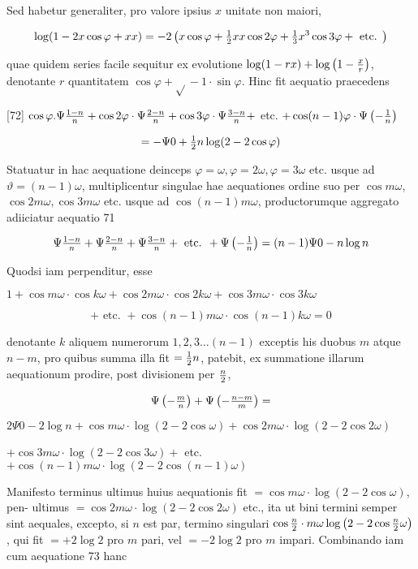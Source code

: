 \documentclass[twoside,12pt, showframe]{memoir}
\let\oldfrac\frac
\def\frac#1#2{\mathchoice{\tfrac{#1}{#2}}{\oldfrac{#1}{#2}}{\genfrac{}{}{}{2}{#1}{#2\mathstrut}}{\genfrac{}{}{}{3}{#1}{#2\mathstrut}}}
\begin{document}
Sed habetur generaliter, pro valore ipsius \(x\) unitate non maiori,

\[
\log (1-2 x \cos \varphi+x x)=-2\left(x \cos \varphi+\frac{1}{2} x x \cos 2 \varphi+\frac{1}{3} x^{3} \cos 3 \varphi+\text { etc. }\right)
\]

quae quidem series facile sequitur ex evolutione \(\log (1-r x)+\log \left(1-\frac{x}{r}\right)\), denotante \(r\) quantitatem \(\cos \varphi+\sqrt{ }-1 \cdot \sin \varphi\). Hinc fit aequatio praecedens

[72] \(\cos \varphi . \Psi \frac{1-n}{n}+\cos 2 \varphi \cdot \Psi \frac{2-n}{n}+\cos 3 \varphi \cdot \Psi \frac{3-n}{n}+\) etc. \(+\cos (n-1) \varphi \cdot \Psi\left(-\frac{1}{n}\right)\)

\[
=-\Psi 0+\frac{1}{2} n \log (2-2 \cos \varphi)
\]

Statuatur in hac aequatione deinceps \(\varphi=\omega, \varphi=2 \omega, \varphi=3 \omega\) etc. usque ad \(\vartheta=(n-1) \omega\), multiplicentur singulae hae aequationes ordine suo per \(\cos m \omega\), \(\cos 2 m \omega, \cos 3 m \omega\) etc. usque ad \(\cos (n-1) m \omega\), productorumque aggregato adiiciatur aequatio 71

\[
\Psi \frac{1-n}{n}+\Psi \frac{2-n}{n}+\Psi \frac{3-n}{n}+\text { etc. }+\Psi\left(-\frac{1}{n}\right)=(n-1) \Psi 0-n \log n
\]

Quodsi iam perpenditur, esse

\(1+\cos m \omega \cdot \cos k \omega+\cos 2 m \omega \cdot \cos 2 k \omega+\cos 3 m \omega \cdot \cos 3 k \omega\)

\[
+ \text { etc. }+\cos (n-1) m \omega \cdot \cos (n-1) k \omega=0
\]

denotante \(k\) aliquem numerorum \(1,2,3 \ldots(n-1)\) exceptis his duobus \(m\) atque \(n-m\), pro quibus summa illa fit \(=\frac{1}{2} n\), patebit, ex summatione illarum aequationum prodire, post divisionem per \(\frac{n}{2}\),

\[
\Psi\left(-\frac{m}{n}\right)+\Psi\left(-\frac{n-m}{m}\right)=
\]

\(2 \Psi 0-2 \log n+\cos m \omega \cdot \log (2-2 \cos \omega)+\cos 2 m \omega \cdot \log (2-2 \cos 2 \omega)\)

\(+\cos 3 m \omega \cdot \log (2-2 \cos 3 \omega)+\) etc. \(+\cos (n-1) m \omega \cdot \log (2-2 \cos (n-1) \omega)\)

Manifesto terminus ultimus huius aequationis fit \(=\cos m \omega \cdot \log (2-2 \cos \omega)\), pen-
ultimus \(=\cos 2 m \omega \cdot \log (2-2 \cos 2 \omega)\) etc., ita ut bini termini semper sint aequales, excepto, si \(n\) est par, termino singulari \(\cos \frac{n}{2} \cdot m \omega \log \left(2-2 \cos \frac{n}{2} \omega\right)\), qui fit \(=+2 \log 2\) pro \(m\) pari, vel \(=-2 \log 2\) pro \(m\) impari. Combinando iam cum aequatione 73 hanc
\end{document}
